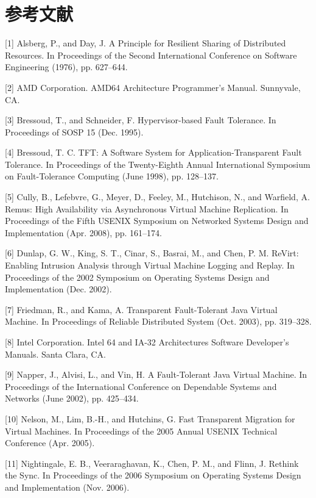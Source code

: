 \section{参考文献}

\begingroup
\footnotesize
\setlength{\parskip}{0pt}
\renewcommand{\baselinestretch}{1}\selectfont

[1] Alsberg, P., and Day, J. A Principle for Resilient Sharing of Distributed Resources.
In Proceedings of the Second International Conference on Software Engineering (1976),
pp. 627--644.

[2] AMD Corporation. AMD64 Architecture Programmer's Manual. Sunnyvale, CA.

[3] Bressoud, T., and Schneider, F. Hypervisor-based Fault Tolerance. In Proceedings of
SOSP 15 (Dec. 1995).

[4] Bressoud, T. C. TFT: A Software System for Application-Transparent Fault Tolerance.
In Proceedings of the Twenty-Eighth Annual International Symposium on Fault-Tolerance
Computing (June 1998), pp. 128--137.

[5] Cully, B., Lefebvre, G., Meyer, D., Feeley, M., Hutchison, N., and Warfield, A.
Remus: High Availability via Asynchronous Virtual Machine Replication. In Proceedings of
the Fifth USENIX Symposium on Networked Systems Design and Implementation (Apr. 2008),
pp. 161--174.

[6] Dunlap, G. W., King, S. T., Cinar, S., Basrai, M., and Chen, P. M. ReVirt: Enabling
Intrusion Analysis through Virtual Machine Logging and Replay. In Proceedings of the
2002 Symposium on Operating Systems Design and Implementation (Dec. 2002).

[7] Friedman, R., and Kama, A. Transparent Fault-Tolerant Java Virtual Machine. In
Proceedings of Reliable Distributed System (Oct. 2003), pp. 319--328.

[8] Intel Corporation. Intel\textregistered{} 64 and IA-32 Architectures Software
Developer's Manuals. Santa Clara, CA.

[9] Napper, J., Alvisi, L., and Vin, H. A Fault-Tolerant Java Virtual Machine. In
Proceedings of the International Conference on Dependable Systems and Networks (June
2002), pp. 425--434.

[10] Nelson, M., Lim, B.-H., and Hutchins, G. Fast Transparent Migration for Virtual
Machines. In Proceedings of the 2005 Annual USENIX Technical Conference (Apr. 2005).

[11] Nightingale, E. B., Veeraraghavan, K., Chen, P. M., and Flinn, J. Rethink the Sync.
In Proceedings of the 2006 Symposium on Operating Systems Design and Implementation
(Nov. 2006).


